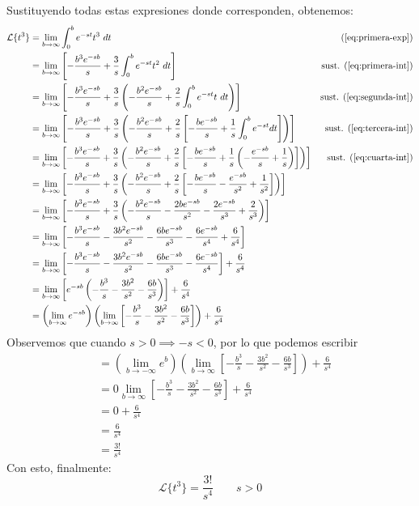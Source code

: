 \documentclass[12pt, a4paper]{article}
\begin{document}
Sustituyendo todas estas expresiones donde corresponden, obtenemos:
\begin{align*}
    \mathcal{L}\{t^3\} &= \lim_{b\to\infty}\int_0^b e^{-st}t^3\ dt & (\ref{eq:primera-exp}) \\
	&=\lim_{b\to\infty} \left[ -\frac{b^3e^{-sb}}{s}+\frac{3}{s}\int_0^b e^{-st}t^2\ dt \right] & \text{sust. } (\ref{eq:primera-int}) \\
    &=\lim_{b\to\infty} \left[ -\frac{b^3e^{-sb}}{s}+\frac{3}{s}\left(-\frac{b^2e^{-sb}}{s}+\frac{2}{s}\int_0^b e^{-st}t\ dt\right) \right] & \text{sust. } (\ref{eq:segunda-int}) \\
    &=\lim_{b\to\infty} \left[ -\frac{b^3e^{-sb}}{s}+\frac{3}{s}\left(-\frac{b^2e^{-sb}}{s}+\frac{2}{s}\left[-\frac{be^{-sb}}{s}+\frac{1}{s}\int_0^b e^{-st}dt\right]\right) \right] & \text{sust. } (\ref{eq:tercera-int}) \\
    &=\lim_{b\to\infty} \left[ -\frac{b^3e^{-sb}}{s}+\frac{3}{s}\left(-\frac{b^2e^{-sb}}{s}+\frac{2}{s}\left[-\frac{be^{-sb}}{s}+\frac{1}{s}\left(-\frac{e^{-sb}}{s}+\frac{1}{s}\right)\right]\right) \right] & \text{sust. } (\ref{eq:cuarta-int}) \\
    &=\lim_{b\to\infty} \left[ -\frac{b^3e^{-sb}}{s}+\frac{3}{s}\left(-\frac{b^2e^{-sb}}{s}+\frac{2}{s}\left[-\frac{be^{-sb}}{s}-\frac{e^{-sb}}{s^2}+\frac{1}{s^2}\right]\right) \right] \\
    &=\lim_{b\to\infty} \left[ -\frac{b^3e^{-sb}}{s}+\frac{3}{s}\left(-\frac{b^2e^{-sb}}{s}-\frac{2be^{-sb}}{s^2}-\frac{2e^{-sb}}{s^3}+\frac{2}{s^3}\right) \right] \\
    &=\lim_{b\to\infty} \left[ -\frac{b^3e^{-sb}}{s}-\frac{3b^2e^{-sb}}{s^2}-\frac{6be^{-sb}}{s^3}-\frac{6e^{-sb}}{s^4}+\frac{6}{s^4} \right] \\
    &=\lim_{b\to\infty} \left[ -\frac{b^3e^{-sb}}{s}-\frac{3b^2e^{-sb}}{s^2}-\frac{6be^{-sb}}{s^3}-\frac{6e^{-sb}}{s^4} \right] + \frac{6}{s^4} \\
    &=\lim_{b\to\infty} \left[ e^{-sb} \left( -\frac{b^3}{s}-\frac{3b^2}{s^2}-\frac{6b}{s^3} \right) \right] + \frac{6}{s^4} \\
	&= \left( \lim_{b \to \infty} e^{-sb} \right) \left( \lim_{b \to \infty} \left[ -\frac{b^3}{s}-\frac{3b^2}{s^2}-\frac{6b}{s^3} \right] \right) + \frac{6}{s^{4}}
\end{align*}
Observemos que cuando \(s > 0 \implies -s < 0\), por lo que podemos escribir
\begin{align*}
	&= \left( \lim_{b \to -\infty} e^{b} \right) \left( \lim_{b \to \infty} \left[ -\frac{b^3}{s}-\frac{3b^2}{s^2}-\frac{6b}{s^3} \right] \right) + \frac{6}{s^{4}} \\
	&= 0 \lim_{b \to \infty} \left[ -\frac{b^3}{s}-\frac{3b^2}{s^2}-\frac{6b}{s^3} \right] + \frac{6}{s^{4}} \\
    &= 0 + \frac{6}{s^4}\\
    &=\frac{6}{s^4} \\
	&=\frac{3!}{s^4}
\end{align*}
Con esto, finalmente:
\[
\mathcal{L}\{t^3\}=\frac{3!}{s^4} \qquad s > 0
\]
\end{document}
